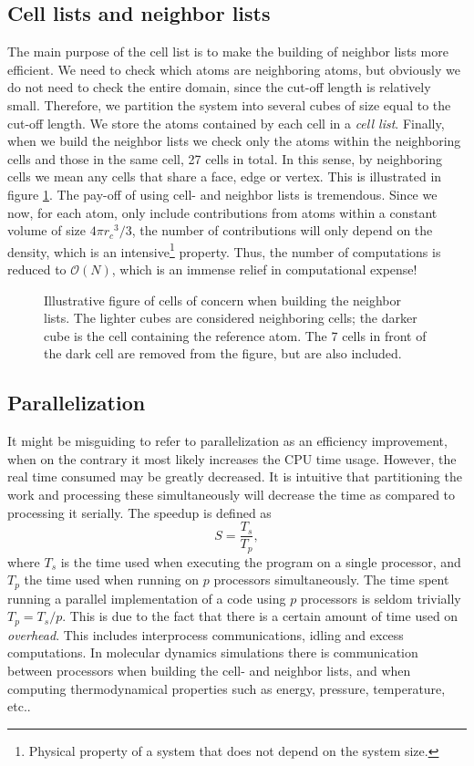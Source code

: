 \documentclass[twoside,english]{uiofysmaster}
\begin{document}
\subsection{Cell lists and neighbor lists}
The main purpose of the cell list is to make the building of neighbor lists more efficient. 
We need to check which atoms are neighboring atoms, but obviously we do not need to check the entire domain, since the cut-off length is relatively small. 
Therefore, we partition the system into several cubes of size equal to the cut-off length. 
We store the atoms contained by each cell in a \textit{cell list}. 
Finally, when we build the neighbor lists we check only the atoms within the neighboring cells and those in the same cell, 27 cells in total. 
In this sense, by neighboring cells we mean any cells that share a face, edge or vertex. 
This is illustrated in figure \ref{fig:neighbourcells}.
The pay-off of using cell- and neighbor lists is tremendous. Since we now, for each atom, only include contributions from atoms within a constant volume of size $4\pi {r_c}^3/3$, 
the number of contributions will only depend on the density, which is an intensive\footnote{Physical property of a system that does not depend on the system size.} property. 
Thus, the number of computations is reduced to $\mathcal{O} (N)$, which is an immense relief in computational expense!

\begin{figure}
	\center
	\resizebox{0.45\linewidth}{!}{
		
	}
	\caption{Illustrative figure of cells of concern when building the neighbor lists. The lighter cubes are considered neighboring cells; the darker cube is the cell containing the reference atom. The 7 cells in front of the dark cell are removed from the figure, but are also included. }
	\label{fig:neighbourcells}
\end{figure}




\subsection{Parallelization}
It might be misguiding to refer to parallelization as an efficiency improvement, when on the contrary it most likely increases the CPU time usage. 
However, the real time consumed may be greatly decreased. 
It is intuitive that partitioning the work and processing these simultaneously will decrease the time as compared to processing it serially.   
The speedup is defined as 
\begin{equation}
S = \frac{T_s}{T_p},
\end{equation}
where $T_s$ is the time used when executing the program on a single processor, and $T_p$ the time used when running on $p$ processors simultaneously.
The time spent running a parallel implementation of a code using $p$ processors is seldom trivially $T_p=T_s/p$. This is due to the fact that there is a certain amount of time used on \textit{overhead}. This includes interprocess communications, idling and excess computations.
In molecular dynamics simulations there is communication between processors when building the cell- and neighbor lists, and when computing thermodynamical properties such as energy, pressure, temperature, etc.. 
\end{document}
